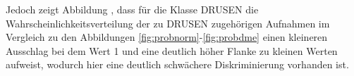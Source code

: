 \setcounter{subfigure}{0} 
 Jedoch zeigt Abbildung \label{fig:probdrusen}, dass für die Klasse DRUSEN die Wahrscheinlichkeitsverteilung der zu DRUSEN zugehörigen Aufnahmen im Vergleich zu den Abbildungen \ref{fig:probnorm}-\ref{fig:probdme} einen kleineren Ausschlag bei dem Wert 1 und eine deutlich höher Flanke zu kleinen Werten aufweist, wodurch hier eine deutlich schwächere Diskriminierung vorhanden ist.  
 

